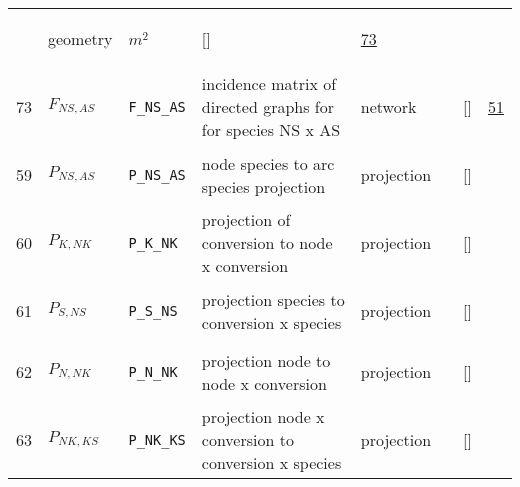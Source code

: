 \begin{longtable}{|p{1cm}|p{3cm}|p{3cm}|p{7cm}|p{3.0cm}|p{3cm}|p{2cm}|p{1cm}|}
             & \begin{lay}geometry \end{lay}
             & $ m^{2} \, $
             & []
             & \hyperlink{"e:73"}{ 73 }
                 \\
    73
             & \hypertarget{"v:73"}{ $ {F}{_{{N S}, {A S}}} $}
             & \verb|F_NS_AS|
             & incidence matrix of directed graphs for for species NS x AS
             & \begin{lay}network \end{lay}
             & $  $
             & []
             & \hyperlink{"e:51"}{ 51 }
                 \\
    59
             & \hypertarget{"v:59"}{ $ {P}{_{{N S}, {A S}}} $}
             & \verb|P_NS_AS|
             & node species to arc species projection
             & \begin{lay}projection \end{lay}
             & $  $
             & []
             & \\
    60
             & \hypertarget{"v:60"}{ $ {P}{_{K, {N K}}} $}
             & \verb|P_K_NK|
             & projection of conversion to node x conversion
             & \begin{lay}projection \end{lay}
             & $  $
             & []
             & \\
    61
             & \hypertarget{"v:61"}{ $ {P}{_{S, {N S}}} $}
             & \verb|P_S_NS|
             & projection species to conversion x species
             & \begin{lay}projection \end{lay}
             & $  $
             & []
             & \\
    62
             & \hypertarget{"v:62"}{ $ {P}{_{N, {N K}}} $}
             & \verb|P_N_NK|
             & projection node to node x conversion
             & \begin{lay}projection \end{lay}
             & $  $
             & []
             & \\
    63
             & \hypertarget{"v:63"}{ $ {P}{_{{N K}, {K S}}} $}
             & \verb|P_NK_KS|
             & projection node x conversion to conversion x species
             & \begin{lay}projection \end{lay}
             & $  $
             & []
             & \\

\end{longtable}
